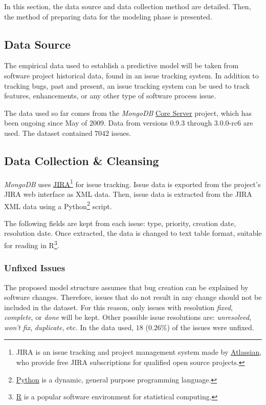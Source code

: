 \documentclass[a4paper]{scrartcl}
\begin{document}
In this section, the data source and data collection method are detailed. Then, the method of preparing data for the modeling phase is presented.

\subsection*{Data Source}
The empirical data used to establish a predictive model will be taken from software project historical data, found in an issue tracking system. In addition to tracking bugs, past and present, an issue tracking system can be used to track features, enhancements, or any other type of software process issue. 

The data used so far comes from the \textit{MongoDB} \href{https://jira.mongodb.org/browse/SERVER}{Core Server} project, which has been ongoing since May of 2009. Data from versions 0.9.3 through 3.0.0-rc6 are used. The dataset contained $7042$ issues.

\subsection*{Data Collection \& Cleansing}
\textit{MongoDB} uses \href{https://www.atlassian.com/software/jira}{JIRA}\footnote{JIRA is an issue tracking and project management system made by \href{https://www.atlassian.com/}{Atlassian}, who provide free JIRA subscriptions for qualified open source projects.} for issue tracking. Issue data is exported from the project's JIRA web interface as XML data. Then, issue data is extracted from the JIRA XML data using a Python\footnote{\href{https://www.python.org/}{Python} is a dynamic, general purpose programming language.} script.

The following fields are kept from each issue: type, priority, creation date, resolution date.  Once extracted, the data is changed to text table format, suitable for reading in R\footnote{\href{http://www.r-project.org/}{R} is a popular software environment for statistical computing.}.

\subsubsection*{Unfixed Issues}
The proposed model structure assumes that bug creation can be explained by software changes. Therefore, issues that do not result in any change should not be included in the dataset. For this reason, only issues with resolution \textit{fixed}, \textit{complete}, or \textit{done} will be kept. Other possible issue resolutions are: \textit{unresolved}, \textit{won't fix}, \textit{duplicate}, etc. In the data used, $18$ ($0.26\%$) of the issues were unfixed. 
\end{document}
